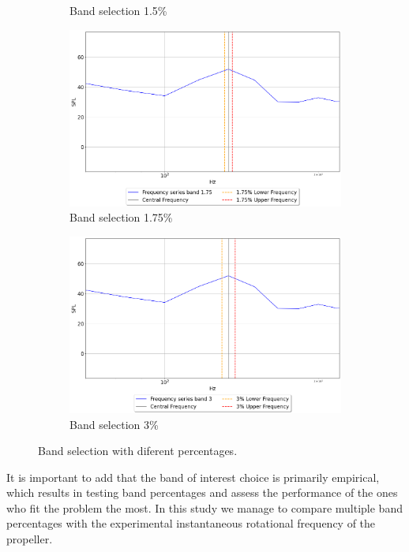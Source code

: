 \documentclass[10pt,fleqn,a4paper,twoside]{article}
\begin{document}
\begin{figure}
\begin{subfigure}{0.4\textwidth}
        \caption{Band selection 1.5\%}
        \label{fig:second}
    \end{subfigure}
    \hfill
    \centering
    \begin{subfigure}{0.4\textwidth}
        \includegraphics[width=\textwidth]{Figures/spectra_band_1.75.png}
        \caption{Band selection 1.75\%}
        \label{fig:third}
    \end{subfigure}
    \centering
    \hfill
    \begin{subfigure}{0.4\textwidth}
        \includegraphics[width=\textwidth]{Figures/spectra_band_3.png}
        \caption{Band selection 3\%}
        \label{fig:third}
    \end{subfigure}
            
    \caption{Band selection with diferent percentages.}
    \label{fig:figures}
    \end{figure}
It is important to add that the band of interest choice is primarily empirical, which results in testing band percentages and assess the performance of the ones who fit the problem the most. In this study we manage to compare multiple band percentages with the experimental instantaneous rotational frequency of the propeller. 
\end{document}
